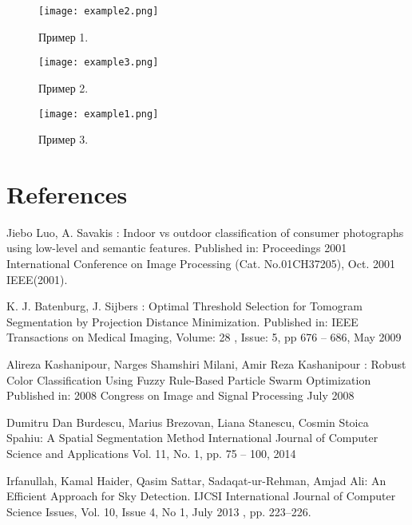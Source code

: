 \documentclass[runningheads]{llncs}
\begin{document}
{\begin{figure}[H]
\begin{minipage}[b]{0.4\textwidth}
    \centering\texttt{[image: example2.png]}
    \caption{Пример 1.}
\end{minipage}
\begin{minipage}[b]{0.4\textwidth}
    \centering\texttt{[image: example3.png]}
    \caption{Пример 2.}
\end{minipage}
\begin{minipage}[b]{0.4\textwidth}
    \centering\texttt{[image: example1.png]}
    \caption{Пример 3.}
\end{minipage}
\end{figure}
%
%
%
% 
% 
%
\section{References}
\begin{thebibliography}{8}
 Jiebo Luo, A. Savakis : Indoor vs outdoor classification of consumer photographs using low-level and semantic features. 
 Published in: Proceedings 2001 International Conference on Image Processing (Cat. No.01CH37205), Oct. 2001 
IEEE(2001). 

 K. J. Batenburg, J. Sijbers : Optimal Threshold Selection for Tomogram Segmentation by Projection Distance Minimization. 
 Published in: IEEE Transactions on Medical Imaging, Volume: 28 , Issue: 5, pp  676 -- 686, May 2009 

 Alireza Kashanipour, Narges Shamshiri Milani, Amir Reza Kashanipour : Robust Color Classification Using Fuzzy Rule-Based Particle Swarm Optimization
Published in: 2008 Congress on Image and Signal Processing 
July 2008

Dumitru Dan Burdescu, Marius Brezovan, Liana Stanescu, Cosmin Stoica Spahiu: A Spatial Segmentation Method
International Journal of Computer Science and Applications
Vol. 11, No. 1, pp. 75 -- 100, 2014 

Irfanullah, Kamal Haider, Qasim Sattar, Sadaqat-ur-Rehman, Amjad Ali: An Efficient Approach for Sky Detection. 
IJCSI International Journal of Computer Science Issues, Vol. 10, Issue 4, No 1, July 2013
, pp. 223--226.


\end{thebibliography}}
\end{document}
